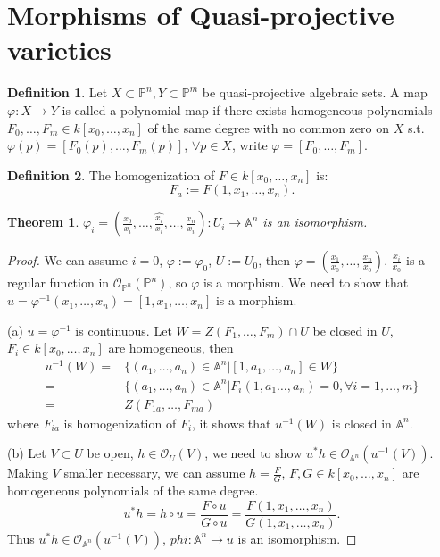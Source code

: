 \documentclass{amsart}
\theoremstyle{plain}
\newtheorem{theorem}{Theorem}
\theoremstyle{definition}
\newtheorem{definition}{Definition}
\theoremstyle{remark}
\numberwithin{equation}{section}
\begin{document}
\section{Morphisms of Quasi-projective varieties}
\begin{definition}
	Let $ X\subset \mathbb{P}^n,Y\subset \mathbb{P}^m $ be quasi-projective algebraic sets. A map $ \varphi:X\to Y $ is called a polynomial map if there exists homogeneous polynomials $ F_0,\dots,F_m\in k[x_0,\dots,x_n] $ of the same degree with no common zero on $ X $ s.t.
	$ \varphi(p)=[F_0(p),\dots,F_m(p)] $, $ \forall p\in X $, write $ \varphi=[F_0,\dots,F_m] $.
\end{definition}
\begin{definition}
	The homogenization of $ F\in k[x_0,\dots,x_n] $ is: 
	$$
	F_a:=F(1,x_1,\dots,x_n).
	$$
\end{definition}
\begin{theorem}\label{13}
	$ \varphi_i=(\frac{x_0}{x_i},\dots,\hat{\frac{x_i}{x_i}},\dots,\frac{x_n}{x_i}):U_i\to \mathbb{A}^n $ is an isomorphism.
\end{theorem}
\begin{proof}
	We can assume $ i=0 $, $ \varphi:=\varphi_0 $, $ U:=U_0 $, then $ \varphi=(\frac{x_1}{x_0},\dots,\frac{x_n}{x_0}) $. $ \frac{x_i}{x_0} $ is a regular function in $ \mathcal{O}_{\mathbb{P}^n}(\mathbb{P}^n) $, so $ \varphi $ is a morphism. We need to show that $ u=\varphi^{-1}(x_1,\dots,x_n)=[1,x_1,\dots,x_n] $ is a morphism. 
	
	(a) $ u=\varphi^{-1} $ is continuous. Let $ W=Z(F_1,\dots,F_m)\cap U $ be closed in $ U $, $ F_i\in k[x_0,\dots,x_n] $ are homogeneous, then
	\begin{align*}
	u^{-1}(W)= & \{ (a_1,\dots,a_n)\in \mathbb{A}^n|[1,a_1,\dots,a_n]\in W \}\\
	= & \{ (a_1,\dots,a_n)\in \mathbb{A}^n|F_i(1,a_1\dots,a_n)=0, \forall i=1,\dots,m \} \\
	= & Z(F_{1a},\dots,F_{ma})
	\end{align*}
	where $ F_{ia} $ is homogenization of $ F_i $, it shows that $ u^{-1}(W) $ is closed in $ \mathbb{A}^n  $.
	
	(b) Let $ V\subset U $ be open, $ h\in \mathcal{O}_U(V) $, we need to show $ u^\ast h\in \mathcal{O}_{\mathbb{A}^n}(u^{-1}(V)) $. Making $ V $ smaller necessary, we can assume $ h=\frac{F}{G} $, $ F,G \in k[x_0,\dots,x_n]$ are homogeneous polynomials of the same degree.
	$$
	u^\ast h = h\circ u=\frac{F\circ u}{G\circ u}=\frac{F(1,x_1,\dots,x_n)}{G(1,x_1,\dots,x_n)}.
	$$ 
	Thus $ u^\ast h\in \mathcal{O}_{\mathbb{A}^n}(u^{-1}(V)) $, $ phi:\mathbb{A}^n\to u $ is an isomorphism.
\end{proof}
\end{document}
